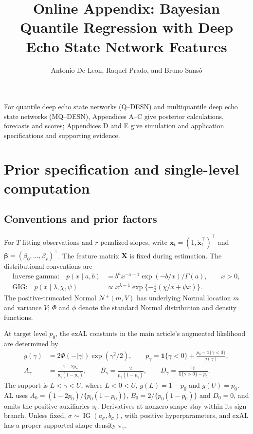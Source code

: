 \documentclass[12pt,letterpaper]{article}
\title{Online Appendix: Bayesian Quantile Regression with Deep Echo State Network Features}
\author{}
\author{Antonio De Leon, Raquel Prado, and Bruno Sans\'o}
\date{}
\makeatletter
\newif\ifQdesnAnonymous
\newcommand{\vect}[1]{\bm{#1}}
\newcommand{\mat}[1]{\bm{#1}}
\newcommand{\ind}{\mathbf{1}}
\newcommand{\TN}{\mathcal{N}^{+}}
\newcommand{\IG}{\operatorname{IG}}
\numberwithin{suppalgorithm}{section}
\numberwithin{equation}{section}
\numberwithin{table}{section}
\numberwithin{figure}{section}
\renewcommand{\maketitle}{%
  \ifQdesnAnonymous
    \begin{center}\bfseries\@title\end{center}%
  \else
    \hypersetup{pageanchor=false}%
    \begin{titlepage}
    \begin{center}\bfseries\@title\par\medskip\normalfont\@author\par\end{center}
    \end{titlepage}%
    \hypersetup{pageanchor=true}%
  \fi
}
\makeatother
\begin{document}
\maketitle

\noindent
For quantile deep echo state networks (Q--DESN) and
multiquantile deep echo state networks (MQ--DESN), Appendices A--C give posterior calculations,
forecasts and scores; Appendices D and E give simulation and application
specifications and supporting evidence.

\section{Prior specification and single-level computation}
\label{sec:appendix-prior-computation}
\label{sec:supp_relation_main}

\subsection{Conventions and prior factors}
\label{sec:dist_conventions}

For \(T\) fitting observations and \(r\) penalized slopes, write
\(\vect x_t=(1,\tilde{\vect x}_t^\top)^\top\) and
\(\vect\beta=(\beta_0,\ldots,\beta_r)^\top\). The feature matrix
\(\mat X\) is fixed during estimation. The distributional conventions are
\[
\begin{aligned}
\text{Inverse gamma:}\quad
 p(x\mid a,b)&=b^a x^{-a-1}\exp(-b/x)/\Gamma(a),\qquad x>0,\\
\text{GIG:}\quad
 p(x\mid\lambda,\chi,\psi)&\propto
 x^{\lambda-1}\exp\{-\tfrac12(\chi/x+\psi x)\}.
\end{aligned}
\]
The positive-truncated Normal \(\TN(m,V)\) has underlying Normal location
\(m\) and variance \(V\); \(\Phi\) and \(\phi\) denote the standard
Normal distribution and density functions.

At target level \(p_0\), the exAL constants in the main article's
augmented likelihood are determined by
\[
\begin{aligned}
g(\gamma)&=2\Phi(-|\gamma|)\exp(\gamma^2/2),\qquad
p_\gamma=\ind\{\gamma<0\}
 +\frac{p_0-\ind\{\gamma<0\}}{g(\gamma)},\\
A_\gamma&=\frac{1-2p_\gamma}{p_\gamma(1-p_\gamma)},\qquad
B_\gamma=\frac{2}{p_\gamma(1-p_\gamma)},\qquad
D_\gamma=\frac{|\gamma|}{\ind\{\gamma>0\}-p_\gamma}.
\end{aligned}
\]
The support is \(L<\gamma<U\), where \(L<0<U\),
\(g(L)=1-p_0\) and \(g(U)=p_0\). AL uses
\(A_0=(1-2p_0)/\{p_0(1-p_0)\}\),
\(B_0=2/\{p_0(1-p_0)\}\) and \(D_0=0\), and omits the positive
auxiliaries \(s_t\). Derivatives at nonzero shape stay within its sign
branch. Unless fixed, \(\sigma\sim\IG(a_\sigma,b_\sigma)\), with
positive hyperparameters, and exAL has a proper supported shape density
\(\pi_\gamma\).
\end{document}
